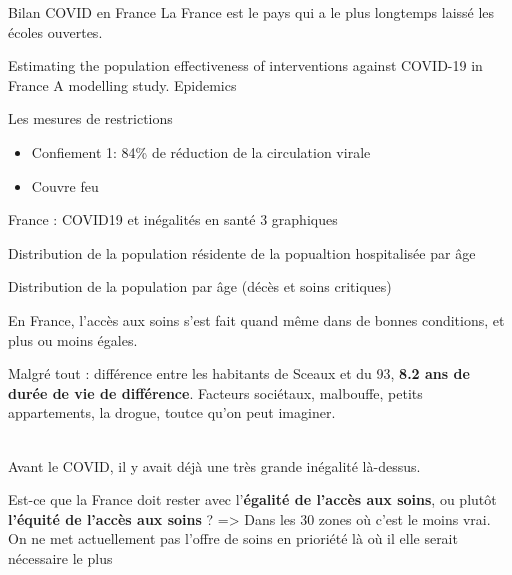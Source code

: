 \documentclass[
  ignorenonframetext,
]{beamer}
\begin{document}
\begin{frame}{Bilan COVID en France}
\protect\hypertarget{bilan-covid-en-france}{}
La France est le pays qui a le plus longtemps laissé les écoles
ouvertes.

Estimating the population effectiveness of interventions against
COVID-19 in France A modelling study. Epidemics
\end{frame}

\begin{frame}{Les mesures de restrictions}
\protect\hypertarget{les-mesures-de-restrictions}{}
\begin{itemize}
\item
  Confiement 1: 84\% de réduction de la circulation virale
\item
  Couvre feu
\end{itemize}
\end{frame}

\begin{frame}{France : COVID19 et inégalités en santé}
\protect\hypertarget{france-covid19-et-inuxe9galituxe9s-en-santuxe9}{}
3 graphiques

Distribution de la population résidente de la popualtion hospitalisée
par âge

Distribution de la population par âge (décès et soins critiques)

\begin{tcolorbox}[enhanced jigsaw, rightrule=.15mm, opacityback=0, colframe=quarto-callout-important-color-frame, bottomtitle=1mm, toptitle=1mm, left=2mm, leftrule=.75mm, title=\textcolor{quarto-callout-important-color}{\faExclamation}\hspace{0.5em}{Important}, toprule=.15mm, breakable, colback=white, coltitle=black, opacitybacktitle=0.6, titlerule=0mm, bottomrule=.15mm, colbacktitle=quarto-callout-important-color!10!white, arc=.35mm]

En France, l'accès aux soins s'est fait quand même dans de bonnes
conditions, et plus ou moins égales.

Malgré tout : différence entre les habitants de Sceaux et du 93,
\textbf{8.2 ans de durée de vie de différence}. Facteurs sociétaux,
malbouffe, petits appartements, la drogue, toutce qu'on peut imaginer.\\
\strut \\
Avant le COVID, il y avait déjà une très grande inégalité là-dessus.

Est-ce que la France doit rester avec l'\textbf{égalité de l'accès aux
soins}, ou plutôt \textbf{l'équité de l'accès aux soins} ?
=\textgreater{} Dans les 30 zones où c'est le moins vrai. On ne met
actuellement pas l'offre de soins en prioriété là où il elle serait
nécessaire le plus

\end{tcolorbox}
\end{frame}
\end{document}
